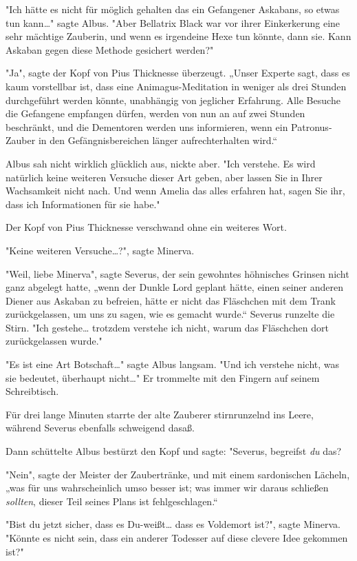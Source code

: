 {"Ich hätte es nicht für möglich gehalten das ein Gefangener Askabans, so etwas tun kann…" sagte Albus. "Aber Bellatrix Black war vor ihrer Einkerkerung eine sehr mächtige Zauberin, und wenn es irgendeine Hexe tun könnte, dann sie. Kann Askaban gegen diese Methode gesichert werden?"

"Ja", sagte der Kopf von Pius Thicknesse überzeugt. „Unser Experte sagt, dass es kaum vorstellbar ist, dass eine Animagus-Meditation in weniger als drei Stunden durchgeführt werden könnte, unabhängig von jeglicher Erfahrung. Alle Besuche die Gefangene empfangen dürfen, werden von nun an auf zwei Stunden beschränkt, und die Dementoren werden uns informieren, wenn ein Patronus-Zauber in den Gefängnisbereichen länger aufrechterhalten wird.“

Albus sah nicht wirklich glücklich aus, nickte aber. "Ich verstehe. Es wird natürlich keine weiteren Versuche dieser Art geben, aber lassen Sie in Ihrer Wachsamkeit nicht nach. Und wenn Amelia das alles erfahren hat, sagen Sie ihr, dass ich Informationen für sie habe."

Der Kopf von Pius Thicknesse verschwand ohne ein weiteres Wort.

"Keine weiteren Versuche…?", sagte Minerva.

"Weil, liebe Minerva", sagte Severus, der sein gewohntes höhnisches Grinsen nicht ganz abgelegt hatte, „wenn der Dunkle Lord geplant hätte, einen seiner anderen Diener aus Askaban zu befreien, hätte er nicht das Fläschchen mit dem Trank zurückgelassen, um uns zu sagen, wie es gemacht wurde.“ Severus runzelte die Stirn. "Ich gestehe… trotzdem verstehe ich nicht, warum das Fläschchen dort zurückgelassen wurde."

"Es ist eine Art Botschaft…" sagte Albus langsam. "Und ich verstehe nicht, was sie bedeutet, überhaupt nicht…" Er trommelte mit den Fingern auf seinem Schreibtisch.

Für drei lange Minuten starrte der alte Zauberer stirnrunzelnd ins Leere, während Severus ebenfalls schweigend dasaß.

Dann schüttelte Albus bestürzt den Kopf und sagte: "Severus, begreifst \emph{du} das?

"Nein", sagte der Meister der Zaubertränke, und mit einem sardonischen Lächeln, „was für uns wahrscheinlich umso besser ist; was immer wir daraus schließen \emph{sollten}, dieser Teil seines Plans ist fehlgeschlagen.“

"Bist du jetzt sicher, dass es Du-weißt… dass es Voldemort ist?", sagte Minerva. "Könnte es nicht sein, dass ein anderer Todesser auf diese clevere Idee gekommen ist?"

}
